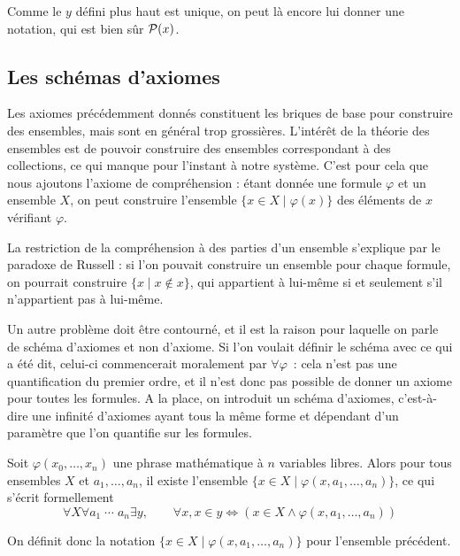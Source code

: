 \begin{notation}
  Comme le $y$ défini plus haut est unique, on peut là encore lui donner une
  notation, qui est bien sûr $\mathcal{P}(x)$.
\end{notation}

\subsection{Les schémas d'axiomes}

Les axiomes précédemment donnés constituent les briques de base pour construire
des ensembles, mais sont en général trop grossières. L'intérêt de la théorie des
ensembles est de pouvoir construire des ensembles correspondant à des
collections, ce qui manque pour l'instant à notre système. C'est pour cela que
nous ajoutons l'axiome de compréhension : étant donnée une formule $\varphi$ et
un ensemble $X$, on peut construire l'ensemble $\{x \in X\mid \varphi(x)\}$ des
éléments de $x$ vérifiant $\varphi$.

La restriction de la compréhension à des parties d'un ensemble s'explique par le
paradoxe de Russell : si l'on pouvait construire un ensemble pour chaque
formule, on pourrait construire $\{ x \mid x\notin x\}$, qui appartient à
lui-même si et seulement s'il n'appartient pas à lui-même.

Un autre problème doit être contourné, et il est la raison pour laquelle on
parle de schéma d'axiomes et non d'axiome. Si l'on voulait définir le schéma
avec ce qui a été dit, celui-ci commencerait moralement par $\forall \varphi$~:
cela n'est pas une quantification du premier ordre, et il n'est donc pas
possible de donner un axiome pour toutes les formules. A la place, on introduit
un schéma d'axiomes, c'est-à-dire une infinité d'axiomes ayant tous la même
forme et dépendant d'un paramètre que l'on quantifie sur les formules.

\begin{axiom}\label{ax.ZF.compre}
  Soit $\varphi(x_0,\ldots,x_n)$ une phrase mathématique à $n$ variables libres.
  Alors pour tous ensembles $X$ et $a_1,\ldots,a_n$, il existe l'ensemble
  $\{x\in X \mid \varphi(x,a_1,\ldots,a_n)\}$, ce qui s'écrit formellement
  \[\forall X\forall a_1\;\cdots\;a_n\exists y,\qquad
    \forall x, x \in y \iff (x\in X\land \varphi(x,a_1,\ldots,a_n))\]
\end{axiom}

\begin{notation}
  On définit donc la notation $\{x\in X\mid \varphi(x,a_1,\ldots,a_n)\}$ pour
  l'ensemble précédent.
\end{notation}

